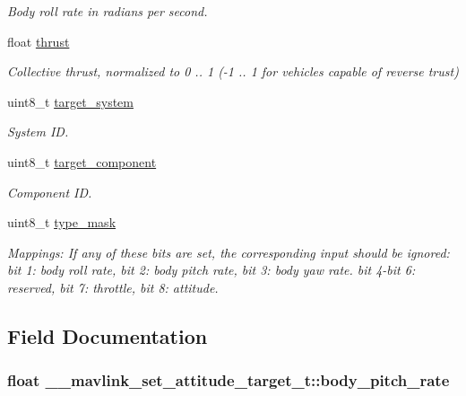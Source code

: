 \begin{DoxyCompactItemize}
\begin{DoxyCompactList}\small\item\em Body roll rate in radians per second. \end{DoxyCompactList}\item 
float \hyperlink{struct____mavlink__set__attitude__target__t_a498c440017ed4e37af8ca5f7f38f6cdb}{thrust}
\begin{DoxyCompactList}\small\item\em Collective thrust, normalized to 0 .. 1 (-\/1 .. 1 for vehicles capable of reverse trust) \end{DoxyCompactList}\item 
uint8\+\_\+t \hyperlink{struct____mavlink__set__attitude__target__t_a386d12bec354c5df517d3f98e9553f94}{target\+\_\+system}
\begin{DoxyCompactList}\small\item\em System I\+D. \end{DoxyCompactList}\item 
uint8\+\_\+t \hyperlink{struct____mavlink__set__attitude__target__t_aeb6a58c02ac3878fb0107aeacf21214e}{target\+\_\+component}
\begin{DoxyCompactList}\small\item\em Component I\+D. \end{DoxyCompactList}\item 
uint8\+\_\+t \hyperlink{struct____mavlink__set__attitude__target__t_a57076cfcacf9c295cc252a6478956f4b}{type\+\_\+mask}
\begin{DoxyCompactList}\small\item\em Mappings\+: If any of these bits are set, the corresponding input should be ignored\+: bit 1\+: body roll rate, bit 2\+: body pitch rate, bit 3\+: body yaw rate. bit 4-\/bit 6\+: reserved, bit 7\+: throttle, bit 8\+: attitude. \end{DoxyCompactList}\end{DoxyCompactItemize}


\subsection{Field Documentation}
\hypertarget{struct____mavlink__set__attitude__target__t_af0695ccb576c9d31fca650c7101ecc79}{
\subsubsection[{body\+\_\+pitch\+\_\+rate}]{\setlength{\rightskip}{0pt plus 5cm}float \+\_\+\+\_\+mavlink\+\_\+set\+\_\+attitude\+\_\+target\+\_\+t\+::body\+\_\+pitch\+\_\+rate}}\label{struct____mavlink__set__attitude__target__t_af0695ccb576c9d31fca650c7101ecc79}


